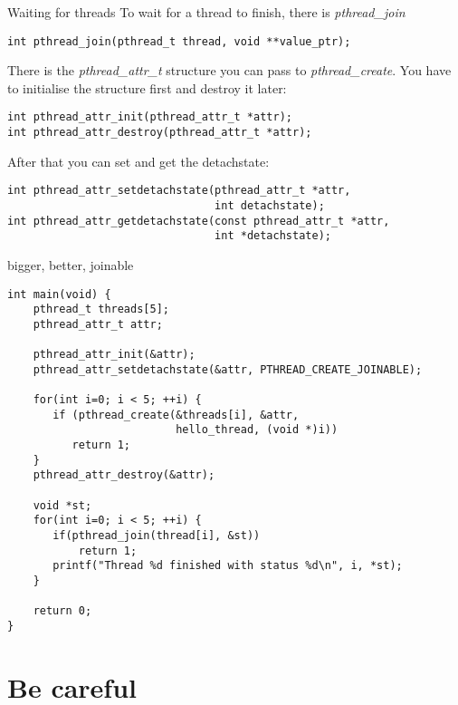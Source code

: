 \begin{frame}[fragile]{Waiting for threads}
    To wait for a thread to finish, there is \textit{pthread\_join}
    \begin{lstlisting}[numbers=none]
int pthread_join(pthread_t thread, void **value_ptr);
\end{lstlisting}
   
    \bigskip
    There is the \textit{pthread\_attr\_t} structure you can pass to \textit{pthread\_create}. You have to initialise the structure first and destroy it later:
    \begin{lstlisting}[numbers=none]
int pthread_attr_init(pthread_attr_t *attr);
int pthread_attr_destroy(pthread_attr_t *attr);
\end{lstlisting}
    \bigskip
    After that you can set and get the detachstate:
    \begin{lstlisting}[numbers=none]
int pthread_attr_setdetachstate(pthread_attr_t *attr,
                                int detachstate);
int pthread_attr_getdetachstate(const pthread_attr_t *attr,
                                int *detachstate);
\end{lstlisting}
\end{frame}

\begin{frame}[fragile]{bigger, better, joinable}
    \begin{lstlisting}[basicstyle=\scriptsize]
int main(void) {
    pthread_t threads[5];
    pthread_attr_t attr;
    
    pthread_attr_init(&attr);
    pthread_attr_setdetachstate(&attr, PTHREAD_CREATE_JOINABLE);
    
    for(int i=0; i < 5; ++i) {
       if (pthread_create(&threads[i], &attr,
                          hello_thread, (void *)i))
          return 1;
    }
    pthread_attr_destroy(&attr);

    void *st;
    for(int i=0; i < 5; ++i) {
       if(pthread_join(thread[i], &st))
           return 1;
       printf("Thread %d finished with status %d\n", i, *st);
    }
    
    return 0;
}
\end{lstlisting}
\end{frame}

\section{Be careful}
